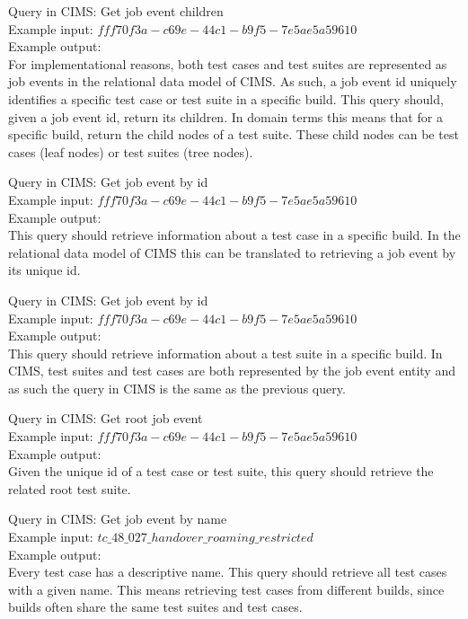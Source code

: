 Query in CIMS: Get job event children \\
Example input: $fff70f3a-c69e-44c1-b9f5-7e5ae5a59610$\\
Example output: \\
For implementational reasons, both test cases and test suites are represented as job events in the relational data model of CIMS. As such, a job event id uniquely identifies a specific test case or test suite in a specific build. This query should, given a job event id, return its children. In domain terms this means that for a specific build, return the child nodes of a test suite. These child nodes can be test cases (leaf nodes) or test suites (tree nodes).


Query in CIMS: Get job event by id \\
Example input: $fff70f3a-c69e-44c1-b9f5-7e5ae5a59610$\\
Example output: \\
This query should retrieve information about a test case in a specific build. In the relational data model of CIMS this can be translated to retrieving a job event by its unique id.

Query in CIMS: Get job event by id \\
Example input: $fff70f3a-c69e-44c1-b9f5-7e5ae5a59610$\\
Example output: \\
This query should retrieve information about a test suite in a specific build. In CIMS, test suites and test cases are both represented by the job event entity and as such the query in CIMS is the same as the previous query.

Query in CIMS: Get root job event \\
Example input: $fff70f3a-c69e-44c1-b9f5-7e5ae5a59610$\\
Example output: \\
Given the unique id of a test case or test suite, this query should retrieve the related root test suite.

Query in CIMS: Get job event by name \\
Example input: $tc\_48\_027\_handover\_roaming\_restricted$\\
Example output: \\
Every test case has a descriptive name. This query should retrieve all test cases with a given name. This means retrieving test cases from different builds, since builds often share the same test suites and test cases.

